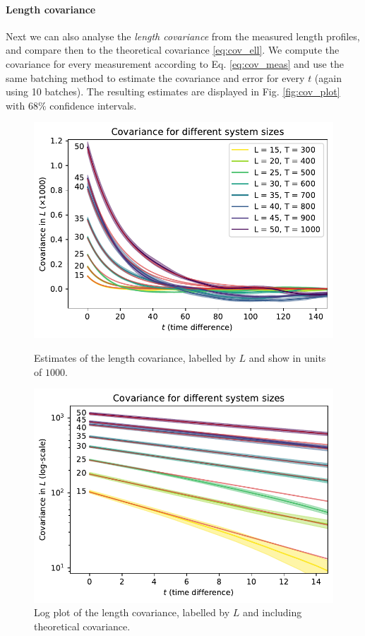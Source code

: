 \paragraph{Length covariance}
Next we can also analyse the \emph{length covariance} from the measured length profiles, and compare then to the theoretical covariance \eqref{eq:cov_ell}.
We compute the covariance for every measurement according to Eq. \eqref{eq:cov_meas} and use the same batching method to estimate the covariance and error for every $t$ (again using 10 batches).
The resulting estimates are displayed in Fig. \ref{fig:cov_plot} with $68\%$ confidence intervals.
\begin{figure}[ht]
    \begin{minipage}[t]{0.49\linewidth}
        \centering
        \includegraphics[width=\linewidth]{img/cov_L.pdf}
        \caption{Estimates of the length covariance, labelled by $L$ and show in units of $1000$.}
        \label{fig:cov_plot}
    \end{minipage}
    \hfill
    \begin{minipage}[t]{0.49\linewidth}
        \centering
        \includegraphics[width=\linewidth]{img/cov_L_log.pdf}
        \caption{Log plot of the length covariance, labelled by $L$ and including theoretical covariance.}
        \label{fig:cov_log_plot}
    \end{minipage}
\end{figure}

